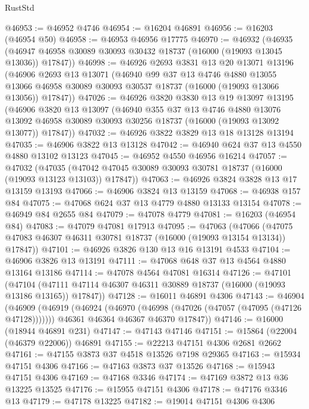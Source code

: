 \begin{lexlean}{RustStd}
\begin{coremodule}
@46953 := @46952 @4746
@46954 := @16204 @46891
@46956 := @16203 (@46954 @50)
@46958 := @46953 @46956 @17775
@46970 := @46932
    (@46935 (@46947 @46958 @30089 @30093 @30432 @18737 (@16000 (@19093 @13045 @13036)) @17847))
@46998 := @46926
    @2693
    @3831
    @13
    @20
    @13071
    @13196
    (@46906
      @2693
      @13
      @13071
      (@46940
        @99
        @37
        @13
        @4746
        @4880
        @13055
        @13066
        @46958
        @30089
        @30093
        @30537
        @18737
        (@16000 (@19093 @13066 @13056))
        @17847))
@47026 := @46926
    @3820
    @3830
    @13
    @19
    @13097
    @13195
    (@46906
      @3820
      @13
      @13097
      (@46940
        @355
        @37
        @13
        @4746
        @4880
        @13076
        @13092
        @46958
        @30089
        @30093
        @30256
        @18737
        (@16000 (@19093 @13092 @13077))
        @17847))
@47032 := @46926 @3822 @3829 @13 @18 @13128 @13194
@47035 := @46906 @3822 @13 @13128
@47042 := @46940 @624 @37 @13 @4550 @4880 @13102 @13123
@47045 := @46952 @4550 @46956 @16214
@47057 := @47032
    (@47035 (@47042 @47045 @30089 @30093 @30781 @18737 (@16000 (@19093 @13123 @13103)) @17847))
@47063 := @46926 @3824 @3828 @13 @17 @13159 @13193
@47066 := @46906 @3824 @13 @13159
@47068 := @46938 @157 @84
@47075 := @47068 @624 @37 @13 @4779 @4880 @13133 @13154
@47078 := @46949 @84 @2655 @84
@47079 := @47078 @4779
@47081 := @16203 (@46954 @84)
@47083 := @47079 @47081 @17913
@47095 := @47063
    (@47066 (@47075 @47083 @46307 @46311 @30781 @18737 (@16000 (@19093 @13154 @13134)) @17847))
@47101 := @46926 @3826 @130 @13 @16 @13191 @4533
@47104 := @46906 @3826 @13 @13191
@47111 := @47068 @648 @37 @13 @4564 @4880 @13164 @13186
@47114 := @47078 @4564 @47081 @16314
@47126 := @47101
    (@47104 (@47111 @47114 @46307 @46311 @30889 @18737 (@16000 (@19093 @13186 @13165)) @17847))
@47128 := @16011 @46891 @4306
@47143 := @46904
    (@46909
      (@46919
        (@46924 (@46970 (@46998 (@47026 (@47057 (@47095 (@47126 @47128)))))))
        @46361
        @46364
        @46367
        @46370
        @17847))
@47146 := @16000 (@18944 @46891 @231)
@47147 := @47143 @47146
@47151 := @15864 (@22004 (@46379 @22006)) @46891
@47155 := @22213 @47151 @4306 @2681 @2662
@47161 := @47155 @3873 @37 @4518 @13526 @7198 @29365
@47163 := @15934 @47151 @4306
@47166 := @47163 @3873 @37 @13526
@47168 := @15943 @47151 @4306
@47169 := @47168 @3346
@47174 := @47169 @3872 @13 @36 @13225 @13525
@47176 := @15955 @47151 @4306
@47178 := @47176 @3346 @13
@47179 := @47178 @13225
@47182 := @19014 @47151 @4306 @4306

\end{coremodule}
\end{lexlean}
